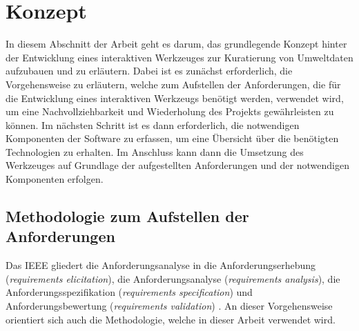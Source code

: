 \chapter{Konzept} %
In diesem Abschnitt der Arbeit geht es darum, das grundlegende Konzept hinter der Entwicklung eines interaktiven Werkzeuges zur Kuratierung von Umweltdaten aufzubauen und zu erläutern. Dabei ist es zunächst erforderlich, 
die Vorgehensweise zu erläutern, welche zum Aufstellen der Anforderungen, die für die Entwicklung eines interaktiven Werkzeugs benötigt werden, verwendet wird, um eine Nachvollziehbarkeit und Wiederholung des Projekts gewährleisten zu 
können. \newline Im nächsten Schritt ist es dann erforderlich, die notwendigen Komponenten der Software zu erfassen, um eine Übersicht über die benötigten Technologien zu erhalten. Im Anschluss kann dann die Umsetzung des Werkzeuges auf Grundlage 
der aufgestellten Anforderungen und der notwendigen Komponenten erfolgen.

\section{Methodologie zum Aufstellen der Anforderungen}
Das \ac{IEEE} gliedert die Anforderungsanalyse in die Anforderungserhebung (\textit{requirements elicitation}), die Anforderungsanalyse (\textit{requirements analysis}), die Anforderungsspezifikation (\textit{requirements specification}) und Anforderungsbewertung 
(\textit{requirements validation}) \cite{ieee2004}. An dieser Vorgehensweise orientiert sich auch die Methodologie, welche in dieser Arbeit verwendet wird.

